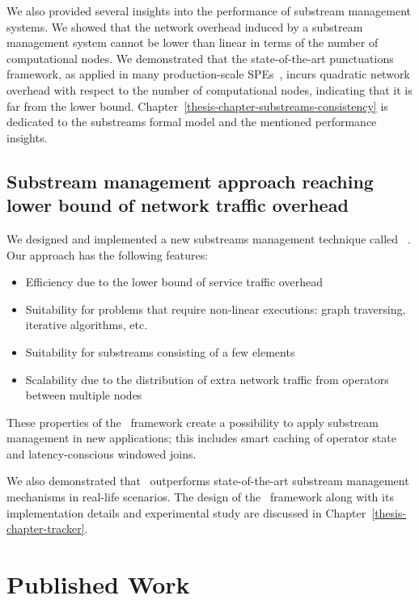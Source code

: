 We also provided several insights into the performance of substream management systems. We showed that the network overhead induced by a substream management system cannot be lower than linear in terms of the number of computational nodes. We demonstrated that the state-of-the-art punctuations framework, as applied in many production-scale SPEs~\cite{tucker2003exploiting}, incurs quadratic network overhead with respect to the number of computational nodes, indicating that it is far from the lower bound. Chapter~\ref{thesis-chapter-substreams-consistency} is dedicated to the substreams formal model and the mentioned performance insights.

\subsection{Substream management approach reaching lower bound of network traffic overhead}

We designed and implemented a new substreams management technique called \tracker~\cite{10.1145/3524860.3539809, trofimov2023bounding}. Our approach has the following features:

\begin{itemize}
    \item Efficiency due to the lower bound of service traffic overhead
    \item Suitability for problems that require non-linear executions: graph traversing, iterative algorithms, etc.
    \item Suitability for substreams consisting of a few elements
    \item Scalability due to the distribution of extra network traffic from operators between multiple nodes
\end{itemize}

These properties of the \tracker\ framework create a possibility to apply substream management in new applications; this includes smart caching of operator state and latency-conscious windowed joins.

We also demonstrated that \tracker\ outperforms state-of-the-art substream management mechanisms in real-life scenarios. The design of the \tracker\ framework along with its implementation details and experimental study are discussed in Chapter~\ref{thesis-chapter-tracker}.

\section{Published Work}

